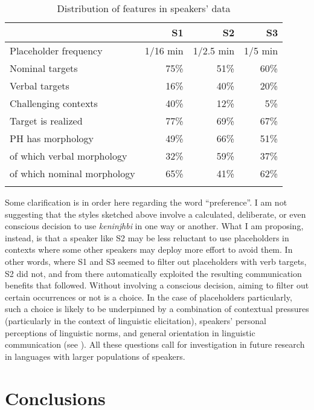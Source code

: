 \documentclass[output=paper]{langscibook}
\begin{document}
\begin{table}
\begin{tabular}{lrrr}
\lsptoprule
 & S1 & S2 & S3\\
\midrule
 Placeholder frequency & 1/16 min & 1/2.5 min & 1/5 min\\
Nominal targets & 75\% & 51\% & 60\%\\
Verbal targets & 16\% & 40\% & 20\%\\
Challenging contexts & 40\% & 12\% & 5\%\\
Target is realized & 77\% & 69\% & 67\%\\
PH has morphology & 49\% & 66\% & 51\%\\
of which verbal morphology & 32\% & 59\% & 37\%\\
of which nominal morphology & 65\% & 41\% & 62\%\\
\lspbottomrule
\end{tabular}
\caption{\label{tab:ponsonnet:2}
Distribution of features in speakers’ data}
\end{table}

Some clarification is in order here regarding the word “preference”. I am not suggesting that the styles sketched above involve a calculated, deliberate, or even conscious decision to use \textit{keninjhbi} in one way or another. What I am proposing, instead, is that a speaker like S2 may be less reluctant to use placeholders in contexts where some other speakers may deploy more effort to avoid them. In other words, where S1 and S3 seemed to filter out placeholders with verb targets, S2 did not, and from there automatically exploited the resulting communication benefits that followed. Without involving a conscious decision, aiming to filter out certain occurrences or not is a choice. In the case of placeholders particularly, such a choice is likely to be underpinned by a combination of contextual pressures (particularly in the context of linguistic elicitation), speakers’ personal perceptions of linguistic norms, and general orientation in linguistic communication (see ). All these questions call for investigation in future research in languages with larger populations of speakers. 

\section{Conclusions} 
\label{sec:ponsonnet:5}
\end{document}
